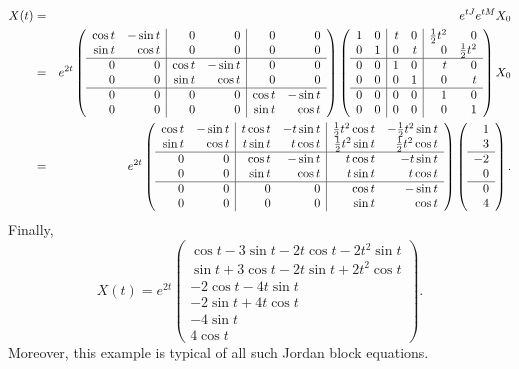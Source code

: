 \documentclass{ximera}
\begin{document}
\begin{eqnarray*}
X(t) & = & e^{tJ}e^{tM}X_0 \\
 & = & e^{2t}\left(\begin{array}{rr|rr|rr} 
 \cos t & -\sin t & 0 & 0 & 0 & 0\\
\sin t & \cos t & 0 & 0 & 0 & 0 \\  
 \hline
 0 & 0 & \cos t & -\sin t & 0 & 0 \\
 0 & 0 & \sin t & \cos t & 0 & 0 \\
\hline
 0 & 0 & 0 & 0 & \cos t & -\sin t\\
 0 & 0 & 0 & 0 & \sin t & \cos t  \end{array}\right) 
\left(\begin{array}{rr|rr|rr} 
 1 & 0 & t & 0 & \mbox{$\frac{1}{2}$} t^2 & 0\\
0 & 1 & 0 & t & 0 & \mbox{$\frac{1}{2}$} t^2 \\  
 \hline
 0 & 0 & 1 & 0 & t & 0 \\
 0 & 0 & 0 & 1 & 0 & t \\
\hline
 0 & 0 & 0 & 0 & 1 & 0\\
 0 & 0 & 0 & 0 & 0 & 1  \end{array}\right) X_0 \\
 & = & e^{2t}\left(\begin{array}{rr|rr|rr} 
 \cos t & -\sin t & t\cos t & -t\sin t & \mbox{$\frac{1}{2}$} t^2\cos t & -\mbox{$\frac{1}{2}$} t^2\sin t\\
\sin t & \cos t & t\sin t & t\cos t & \mbox{$\frac{1}{2}$} t^2\sin t & \mbox{$\frac{1}{2}$} t^2\cos t \\  
 \hline
 0 & 0 & \cos t & -\sin t & t\cos t & -t\sin t \\
 0 & 0 & \sin t & \cos t & t\sin t & t\cos t \\
\hline
 0 & 0 & 0 & 0 & \cos t & -\sin t\\
 0 & 0 & 0 & 0 & \sin t & \cos t  \end{array}\right)
\left(\begin{array}{r} 1 \\ 3 \\ \hline -2 \\  0 \\ \hline 0 \\ 4
\end{array}\right).
\end{eqnarray*}
Finally,
\[
X(t) = e^{2t}\left(\begin{array}{c}
\cos t - 3\sin t -2t\cos t - 2t^2\sin t \\
\sin t + 3\cos t -2t\sin t + 2t^2\cos t \\
-2\cos t - 4t\sin t \\
-2\sin t + 4t\cos t \\
-4\sin t \\ 4\cos t \end{array}\right).
\]
Moreover, this example is typical of all such Jordan block equations. 
\end{document}
